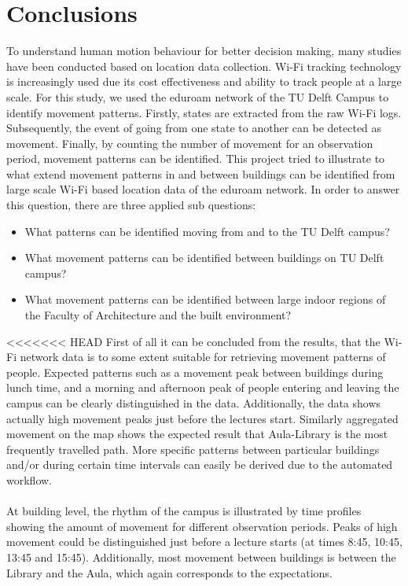 \chapter{Conclusions}\label{conclusion}
To understand human motion behaviour for better decision making, many studies have been conducted based on location data collection. Wi-Fi tracking technology is increasingly used due its cost effectiveness and ability to track people at a large scale. For this study, we used the eduroam network of the TU Delft Campus to identify movement patterns. Firstly, states are extracted from the raw Wi-Fi logs.  Subsequently, the event of going from one state to another can be detected as movement. Finally, by counting the number of movement for an observation period, movement patterns can be identified. This project tried to illustrate to what extend movement patterns in and between buildings can be identified from large scale Wi-Fi based location data of the eduroam network. In order to answer this question, there are three applied sub questions:
\begin{itemize}
\item What patterns can be identified moving from and to the TU Delft campus?
\item What movement patterns can be identified between buildings on TU Delft campus?
\item What movement patterns can be identified between large indoor regions of the Faculty of Architecture and the built environment?
\end{itemize}
<<<<<<< HEAD
First of all it can be concluded from the results, that the Wi-Fi network data is to some extent suitable for retrieving movement patterns of people. Expected patterns such as a movement peak between buildings during lunch time, and a morning and afternoon peak of people entering and leaving the campus can be clearly distinguished in the data. Additionally, the data shows actually high movement peaks just before the lectures start. Similarly aggregated movement on the map shows the expected result that Aula-Library is the most frequently travelled path. More specific patterns between particular buildings and/or during certain time intervals can easily be derived due to the automated workflow.
\\\\
At building level, the rhythm of the campus is illustrated by time profiles showing the amount of movement for different observation periods. Peaks of high movement could be distinguished just before a lecture starts (at times 8:45, 10:45, 13:45 and 15:45). Additionally, most movement between buildings is between the Library and the Aula, which again corresponds to the expectations.
